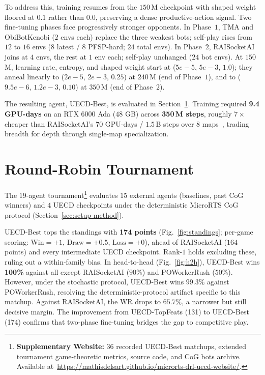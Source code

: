 \documentclass[conference]{IEEEtran}
\newcommand{\code}[1]{{\ttfamily\hyphenchar\font=45\relax #1}}
\begin{document}
To address this, training resumes from the $150$\,M checkpoint with shaped weight floored at $0.1$ rather than $0.0$, preserving a dense productive-action signal. Two fine-tuning phases face progressively stronger opponents. In Phase~$1$, TMA and ObiBotKenobi ($2$ envs each) replace the three weakest bots; self-play rises from $12$ to $16$ envs ($8$ latest / $8$ PFSP-hard; $24$ total envs). In Phase~$2$, RAISocketAI joins at $4$ envs, the rest at $1$ env each; self-play unchanged ($24$ bot envs). At $150$\,M, learning rate, entropy, and shaped weight start at ($5e{-}5$, $5e{-}3$, $1.0$); they anneal linearly to ($2e{-}5$, $2e{-}3$, $0.25$) at $240$\,M (end of Phase~$1$), and to ($9.5e{-}6$, $1.2e{-}3$, $0.10$) at $350$\,M (end of Phase~$2$).

The resulting agent, \code{UECD-Best}, is evaluated in Section~\ref{sec:tournament}. Training required \textbf{9.4 GPU-days} on an RTX $6000$ Ada ($48$ GB) across \textbf{350\,M steps}, roughly $7\times$ cheaper than RAISocketAI's $70$ GPU-days / $1.5$\,B steps over $8$ maps~\cite{goodfriendCompetitionWinningDeep2024}, trading breadth for depth through single-map specialization.

\section{Round-Robin Tournament}
\label{sec:tournament}

The $19$-agent tournament\footnote{\textbf{Supplementary Website:} $36$ recorded \code{UECD-Best} matchups, extended tournament game-theoretic metrics, source code, and CoG bots archive. Available at~\url{https://mathisdelsart.github.io/microrts-drl-uecd-website/}.} evaluates $15$ external agents (baselines, past CoG winners) and $4$ UECD checkpoints under the deterministic MicroRTS CoG protocol (Section~\ref{sec:setup-method}).

\code{UECD-Best} tops the standings with \textbf{174 points} (Fig.~\ref{fig:standings}; per-game scoring: $\text{Win}=+1$, $\text{Draw}=+0.5$, $\text{Loss}=+0$), ahead of RAISocketAI ($164$ points) and every intermediate \code{UECD} checkpoint. Rank-$1$ holds excluding these, ruling out a within-family bias. In head-to-head (Fig.~\ref{fig:h2h}), \code{UECD-Best} wins \textbf{100\%} against all except RAISocketAI ($90$\%) and POWorkerRush ($50$\%). However, under the stochastic protocol, \code{UECD-Best} wins $99.3$\% against POWorkerRush, resolving the deterministic-protocol artifact specific to this matchup. Against RAISocketAI, the WR drops to $65.7$\%, a narrower but still decisive margin. The improvement from \code{UECD-TopFeats} (131) to \code{UECD-Best} (174) confirms that two-phase fine-tuning bridges the gap to competitive play.
\end{document}
